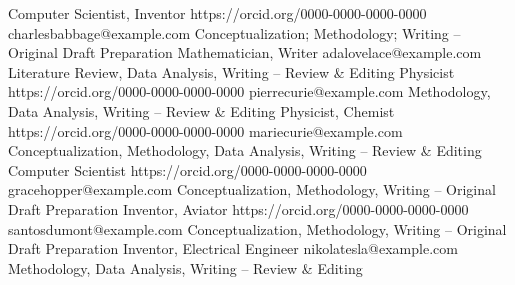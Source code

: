 {Computer Scientist, Inventor}
{https://orcid.org/0000-0000-0000-0000}
{charlesbabbage@example.com}
{Conceptualization; Methodology; Writing – Original Draft Preparation}
% 
{Mathematician, Writer}
{} 
{adalovelace@example.com}
{Literature Review, Data Analysis, Writing – Review \& Editing}
% 
{Physicist}
{https://orcid.org/0000-0000-0000-0000}
{pierrecurie@example.com}
{Methodology, Data Analysis, Writing – Review \& Editing}
% 
{Physicist, Chemist}
{https://orcid.org/0000-0000-0000-0000}
{mariecurie@example.com}
{Conceptualization, Methodology, Data Analysis, Writing – Review \& Editing}
% 
{Computer Scientist}
{https://orcid.org/0000-0000-0000-0000}
{gracehopper@example.com}
{Conceptualization, Methodology, Writing – Original Draft Preparation}
% 
{Inventor, Aviator}
{https://orcid.org/0000-0000-0000-0000}
{santosdumont@example.com}
{Conceptualization, Methodology, Writing – Original Draft Preparation}
%
{Inventor, Electrical Engineer}
{} 
{nikolatesla@example.com}
{Methodology, Data Analysis, Writing – Review \& Editing}
%
